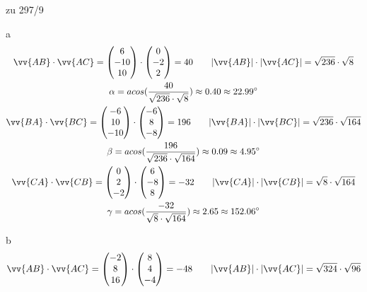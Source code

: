 \begin{exercise}{zu 297/9}
  \item [a]
  \begin{gather*}
    \vv{AB} \cdot \vv{AC} = \begin{pmatrix}6 \\ -10 \\ 10\end{pmatrix} \cdot \begin{pmatrix}0 \\ -2 \\ 2\end{pmatrix} = 40 \qquad |\vv{AB}| \cdot |\vv{AC}| = \sqrt{236} \cdot \sqrt{8} \\
    \alpha = acos(\frac{40}{\sqrt{236} \cdot \sqrt{8}}) \approx 0.40 \approx 22.99^\circ \\
    \vv{BA} \cdot \vv{BC} = \begin{pmatrix}-6 \\ 10 \\ -10\end{pmatrix} \cdot \begin{pmatrix}-6 \\ 8 \\ -8\end{pmatrix} = 196 \qquad |\vv{BA}| \cdot |\vv{BC}| = \sqrt{236} \cdot \sqrt{164} \\
    \beta = acos(\frac{196}{\sqrt{236} \cdot \sqrt{164}}) \approx 0.09 \approx 4.95^\circ \\
    \vv{CA} \cdot \vv{CB} = \begin{pmatrix}0 \\ 2 \\ -2\end{pmatrix} \cdot \begin{pmatrix}6 \\ -8 \\ 8\end{pmatrix} = -32 \qquad |\vv{CA}| \cdot |\vv{CB}| = \sqrt{8} \cdot \sqrt{164} \\
    \gamma = acos(\frac{-32}{\sqrt{8} \cdot \sqrt{164}}) \approx 2.65 \approx 152.06^\circ
  \end{gather*}
  \item [b]
  \begin{gather*}
    \vv{AB} \cdot \vv{AC} = \begin{pmatrix}-2 \\ 8 \\ 16\end{pmatrix} \cdot \begin{pmatrix}8 \\ 4 \\ -4\end{pmatrix} = -48 \qquad |\vv{AB}| \cdot |\vv{AC}| = \sqrt{324} \cdot \sqrt{96} \\

\end{gather*}
\end{exercise}
